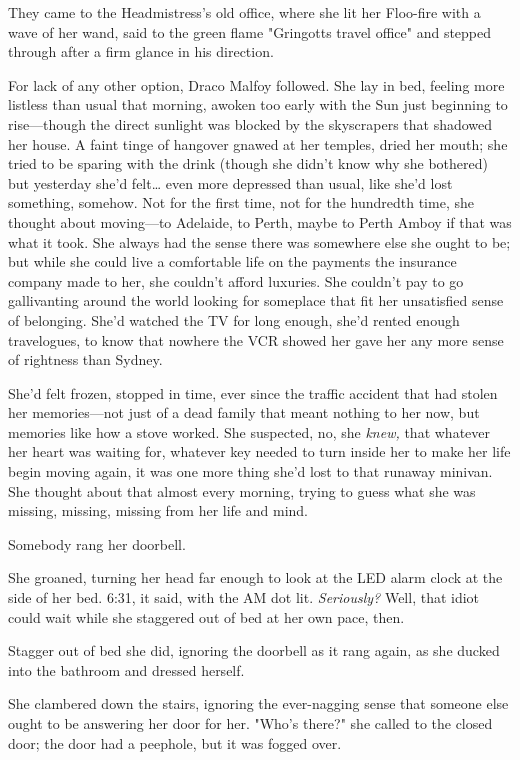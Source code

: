 They came to the Headmistress's old office, where she lit her Floo-fire with a
wave of her wand, said to the green flame "Gringotts travel office" and stepped
through after a firm glance in his direction.

For lack of any other option, Draco Malfoy followed.
\later
She lay in bed, feeling more listless than usual that morning, awoken too early
with the Sun just beginning to rise---though the direct sunlight was blocked by
the skyscrapers that shadowed her house. A faint tinge of hangover gnawed at
her temples, dried her mouth; she tried to be sparing with the drink (though
she didn't know why she bothered) but yesterday she'd felt{\ldots} even more
depressed than usual, like she'd lost something, somehow. Not for the first
time, not for the hundredth time, she thought about moving---to Adelaide, to
Perth, maybe to Perth Amboy if that was what it took. She always had the sense
there was somewhere else she ought to be; but while she could live a
comfortable life on the payments the insurance company made to her, she
couldn't afford luxuries. She couldn't pay to go gallivanting around the world
looking for someplace that fit her unsatisfied sense of belonging. She'd
watched the TV for long enough, she'd rented enough travelogues, to know that
nowhere the VCR showed her gave her any more sense of rightness than Sydney.

She'd felt frozen, stopped in time, ever since the traffic accident that had
stolen her memories---not just of a dead family that meant nothing to her now,
but memories like how a stove worked. She suspected, no, she \emph{knew,} that
whatever her heart was waiting for, whatever key needed to turn inside her to
make her life begin moving again, it was one more thing she'd lost to that
runaway minivan. She thought about that almost every morning, trying to guess
what she was missing, missing, missing from her life and mind.

Somebody rang her doorbell.

She groaned, turning her head far enough to look at the LED alarm clock at the
side of her bed. 6:31, it said, with the AM dot lit. \emph{Seriously?} Well,
that idiot could wait while she staggered out of bed at her own pace, then.

Stagger out of bed she did, ignoring the doorbell as it rang again, as she
ducked into the bathroom and dressed herself.

She clambered down the stairs, ignoring the ever-nagging sense that someone
else ought to be answering her door for her. "Who's there?" she called to the
closed door; the door had a peephole, but it was fogged over.

